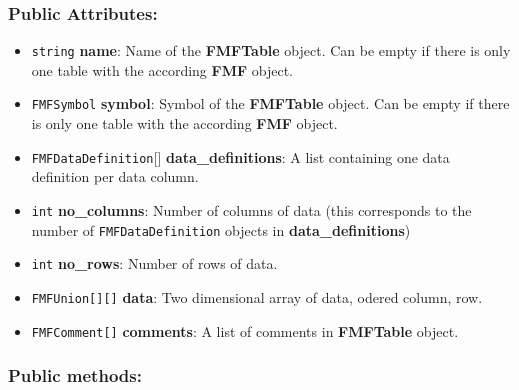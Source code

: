 \documentclass[10pt,utf8, mainlanguage=english]{ufcd-info}
\newcommand{\fret}[1]{{\texttt{#1}}}
\newcommand{\fmfattr}[1]{{\textbf{#1}}}
\newcommand{\fmfobj}[1]{{\textbf{\textsf{#1}}}}
\begin{document}
\subsubsection{Public Attributes:}
\begin{itemize}
	\item \fret{string} \fmfattr{name}: Name of the \fmfobj{FMFTable} object. Can be empty if there is only one table with the according \fmfobj{FMF} object.

	\item \fret{FMFSymbol} \fmfattr{symbol}: Symbol of the \fmfobj{FMFTable} object. Can be empty if there is only one table with the according \fmfobj{FMF} object.

	\item \fret{FMFDataDefinition}[] \fmfattr{data\_definitions}: A list containing one data definition per data column.

	\item \fret{int} \fmfattr{no\_columns}: Number of columns of data (this corresponds to the number of \fret{FMFDataDefinition} objects in \fmfattr{data\_definitions})

	\item \fret{int} \fmfattr{no\_rows}: Number of rows of data.

	\item \fret{FMFUnion[][]} \fmfattr{data}: Two dimensional array of data, odered column, row. 

	\item \fret{FMFComment[]} \fmfattr{comments}: A list of comments in \fmfobj{FMFTable} object.
\end{itemize}

\subsubsection{Public methods:} 
\end{document}
